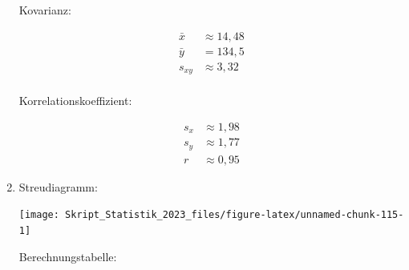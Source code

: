 \documentclass[
  11pt,
  ngerman,
  a4paper,
]{report}
\begin{document}
\begin{enumerate}
  Kovarianz:

  \[\begin{aligned}
   \bar{x} &\approx 14{,}48\\
   \bar{y} &=134{,}5\\
   s_{xy}&\approx 3{,}32\\
   \end{aligned}\]

  Korrelationskoeffizient:

  \[\begin{aligned}
   s_x &\approx 1{,}98\\
   s_y &\approx 1{,}77\\
   r &\approx 0{,}95
   \end{aligned}\]
\item
  Streudiagramm:

  \begin{center}\texttt{[image: Skript\_Statistik\_2023\_files/figure-latex/unnamed-chunk-115-1]} \end{center}

  Berechnungstabelle:


\end{enumerate}
\end{document}
